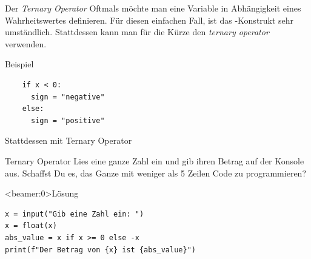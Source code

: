\begin{fragile}{}
\begin{block}{Der \emph{Ternary Operator}}
\vspace{2pt}
Oftmals möchte man eine Variable in Abhängigkeit eines Wahrheitswertes definieren. Für diesen einfachen Fall, ist das -Konstrukt sehr umständlich. Stattdessen kann man für die Kürze den \emph{ternary operator} verwenden. 
\end{block}
\vspace{12pt}
\pause
\begin{exampleblock}{Beispiel}
	\vspace{2pt}
	\begin{verbatim}
	if x < 0: 
	  sign = "negative"	
	else: 
	  sign = "positive"
	\end{verbatim}
\end{exampleblock}
\pause 
\begin{block}{Stattdessen mit Ternary Operator}
	\vspace{2pt}
\end{block}
\end{fragile}

\begin{fragile}[Übung]

\begin{block}{Ternary Operator}
	\vspace{2pt}
Lies eine ganze Zahl ein und gib ihren Betrag auf der Konsole aus. Schaffst Du es, das Ganze mit weniger als 5 Zeilen Code zu programmieren? 
\end{block}

\vspace{12pt}

\begin{solutionblock}<beamer:0>{Lösung}
\begin{verbatim}
x = input("Gib eine Zahl ein: ")
x = float(x)
abs_value = x if x >= 0 else -x
print(f"Der Betrag von {x} ist {abs_value}")
\end{verbatim}
\end{solutionblock}

\end{fragile}




